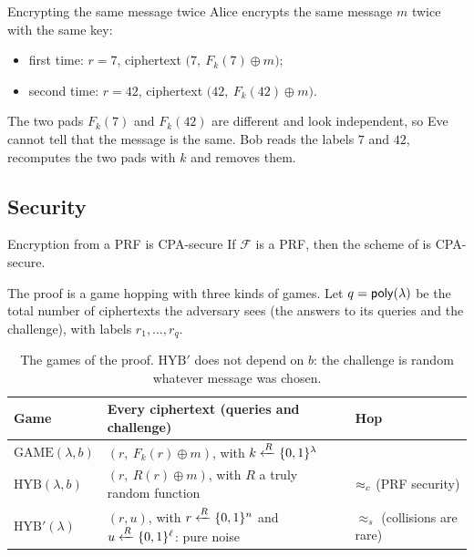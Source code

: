\begin{framedex}{Encrypting the same message twice}
  Alice encrypts the same message $m$ twice with the same key:
  \begin{itemize}
    \item first time: $r = 7$, ciphertext $\big(7,\ F_k(7) \oplus m\big)$;
    \item second time: $r = 42$, ciphertext $\big(42,\ F_k(42) \oplus m\big)$.
  \end{itemize}
  The two pads $F_k(7)$ and $F_k(42)$ are different and look independent, so Eve cannot tell that the message is the same. Bob reads the labels $7$ and $42$, recomputes the two pads with $k$ and removes them.
\end{framedex}

\subsection{Security}

\begin{framedthm}[label={thm:prf-cpa}]{Encryption from a PRF is CPA-secure}
  If $\mathcal{F}$ is a PRF, then the scheme of  is CPA-secure.
\end{framedthm}

The proof is a game hopping with three kinds of games. Let $q = \mathsf{poly}(\lambda)$ be the total number of ciphertexts the adversary sees (the answers to its queries and the challenge), with labels $r_1, \ldots, r_q$.

\begin{table}[H]
  \centering
  \small
  \begin{tabularx}{\textwidth}{@{}lXl@{}}
    \toprule
    \textbf{Game} & \textbf{Every ciphertext (queries and challenge)} & \textbf{Hop} \\
    \midrule
    $\mathrm{GAME}(\lambda, b)$ & $(r,\ F_k(r) \oplus m)$, with $k \xleftarrow{R} \{0,1\}^\lambda$ & \\
    $\mathrm{HYB}(\lambda, b)$ & $(r,\ R(r) \oplus m)$, with $R$ a truly random function & $\approx_c$ (PRF security) \\
    $\mathrm{HYB}'(\lambda)$ & $(r, u)$, with $r \xleftarrow{R} \{0,1\}^n$ and $u \xleftarrow{R} \{0,1\}^\ell$: pure noise & $\approx_s$ (collisions are rare) \\
    \bottomrule
  \end{tabularx}
  \caption{The games of the proof. $\mathrm{HYB}'$ does not depend on $b$: the challenge is random whatever message was chosen.}
\end{table}

